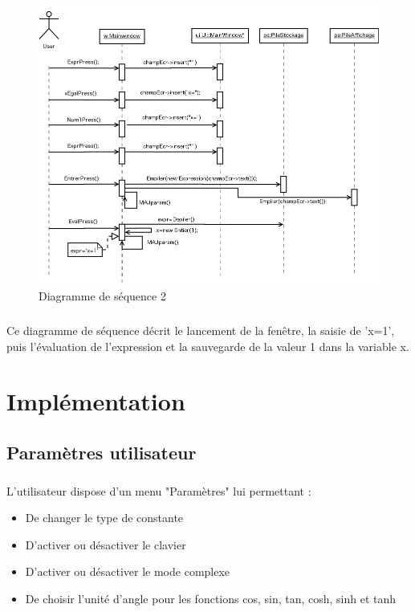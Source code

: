 \documentclass[a4paper,12pt]{report}
\begin{document}
		\begin{figure}[H]
			\center
			\includegraphics[width=16cm]{diag_seq_2.png}
			\caption{Diagramme de séquence 2}
			\label{Diagramme sequence 2}
		\end{figure}
		
		\paragraph{}Ce diagramme de séquence décrit le lancement de la fenêtre, la saisie de 'x=1', puis l'évaluation de l'expression et la sauvegarde de la valeur 1 dans la variable x.

\chapter{Implémentation}

	\section{Paramètres utilisateur}
		\paragraph{}L'utilisateur dispose d'un menu "Paramètres" lui permettant :
		\begin{itemize}
			\item{De changer le type de constante}
			\item{D'activer ou désactiver le clavier}
			\item{D'activer ou désactiver le mode complexe}
			\item{De choisir l'unité d'angle pour les fonctions cos, sin, tan, cosh, sinh et tanh}
		\end{itemize}
		
\end{document}
